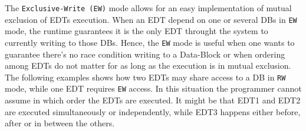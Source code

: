 The {\tt Exclusive-Write (EW)} mode allows for an easy implementation of mutual exclusion of EDTs execution. When an EDT depend on one or several DBs in {\tt EW} mode, the runtime guarantees it is the only EDT throught the system to currently writing to those DBs.
Hence, the {\tt EW} mode is useful when one wants to guarantee there's no race condition writing to a Data-Block or when ordering among EDTs do not matter for as long as the execution is in mutual exclusion. The following examples shows how two EDTs may share access to a DB in {\tt RW} mode, while one EDT requires {\tt EW} access. In this situation the programmer cannot assume in which order the EDTs are executed. It might be that EDT1 and EDT2 are executed simultaneously or independently, while EDT3 happens either before, after or in between the others.


